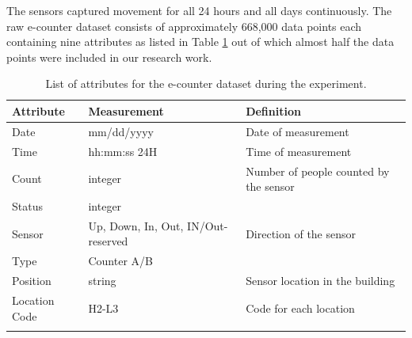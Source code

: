 \begin{itemize}
\begin{table}[ht]
\begin{tabular}{c c c}
    \end{tabular}
    
\end{table}



The sensors captured movement for all 24 hours and all days continuously. The raw e-counter dataset consists of approximately 668,000 data points each containing nine attributes as listed in Table \ref{attr} out of which almost half the data points were included in our research work. 


\begin{table}[!h]{}
\centering
\caption{List of attributes for the e-counter dataset during the experiment.}

    \begin{tabular}{p{2cm} p{3.5cm}  p{4.5cm} }
    \hline
    \textbf{Attribute} & \textbf{Measurement} & \textbf{Definition}\\ \hline
    \midrule
Date             &  mm/dd/yyyy      &   Date of measurement                                 \\\hline
Time             &  hh:mm:ss 24H    &   Time of measurement                                 \\\hline
Count            &  integer         &   Number of people counted by the sensor              \\ \hline
Status           &  integer         &                                                        \\ \hline  
Sensor           &  Up, Down, In, Out, IN/Out-reserved & Direction of the sensor             \\ \hline
Type             &  Counter A/B                                                             \\ \hline
Position         &    string         &   Sensor location in the building                                                                                                      \\ \hline
Location Code    &     H2-L3             & Code for each location                                                                                                                                       \\ \hline
    \bottomrule
    \label{attr}
\end{tabular}
\end{table}








\end{itemize}
